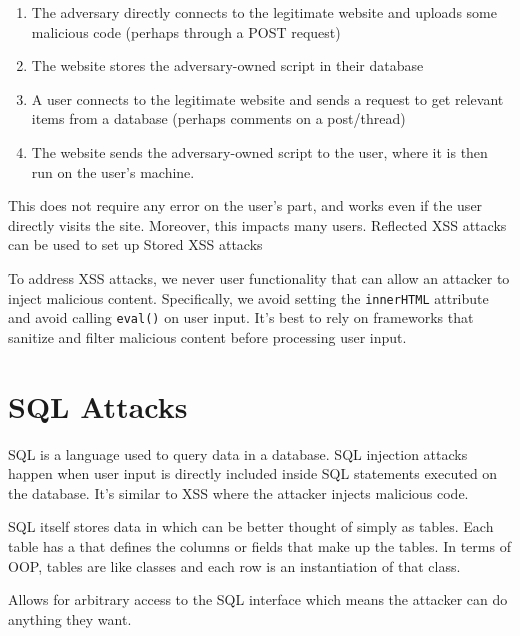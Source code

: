\begin{enumerate}
    \item The adversary directly connects to the legitimate website and uploads some malicious code (perhaps through a POST request)
    \item The website stores the adversary-owned script in their database
    \item A user connects to the legitimate website and sends a request to get relevant items from a database (perhaps comments on a post/thread)
    \item The website sends the adversary-owned script to the user, where it is then run on the user's machine.
\end{enumerate}

This does not require any error on the user's part, and works even if the user directly visits the site. Moreover, this impacts many users. Reflected XSS attacks can be used to set up Stored XSS attacks

To address XSS attacks, we never user functionality that can allow an attacker to inject malicious content. Specifically, we avoid setting the \texttt{innerHTML} attribute and avoid calling \texttt{eval()} on user input. It's best to rely on frameworks that sanitize and filter malicious content before processing user input.

\section{SQL Attacks}
SQL is a language used to query data in a database. SQL injection attacks happen when user input is directly included inside SQL statements executed on the database. It's similar to XSS where the attacker injects malicious code.

SQL itself stores data in  which can be better thought of simply as tables. Each table has a  that defines the columns or fields that make up the tables. In terms of OOP, tables are like classes and each row is an instantiation of that class.



Allows for arbitrary access to the SQL interface which means the attacker can do anything they want.
